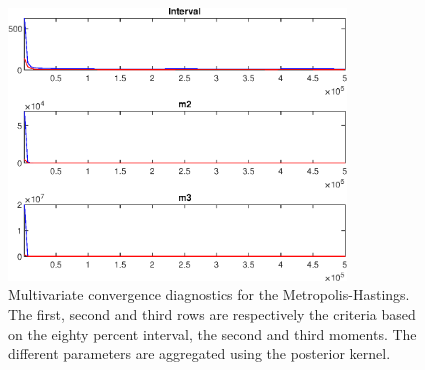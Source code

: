  
\begin{figure}[H]
\centering 
\includegraphics[width=0.8\textwidth]{BRS_growth_ext_shopping/Output/BRS_growth_ext_shopping_mdiag}
\caption{Multivariate convergence diagnostics for the Metropolis-Hastings.
The first, second and third rows are respectively the criteria based on
the eighty percent interval, the second and third moments. The different 
parameters are aggregated using the posterior kernel.}\label{Fig:MultivariateDiagnostics}
\end{figure}

